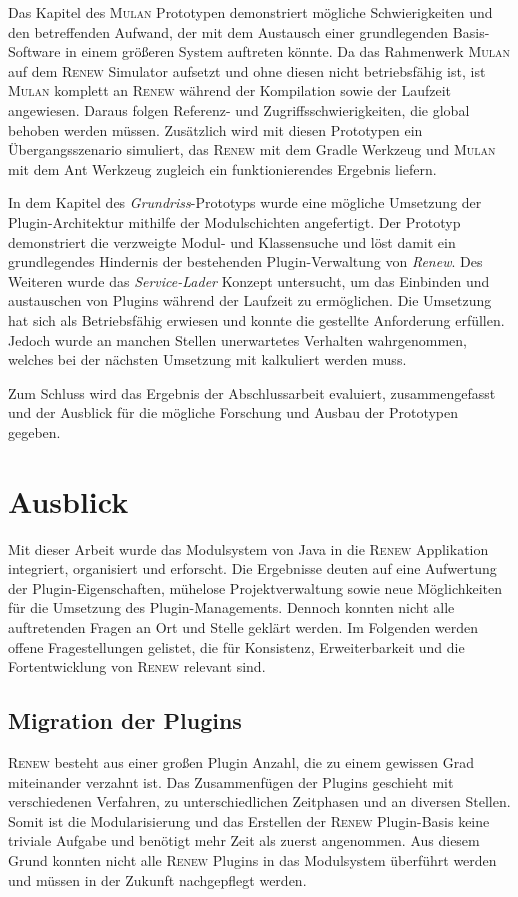 Das Kapitel des \textsc{Mulan} Prototypen demonstriert mögliche Schwierigkeiten und den betreffenden Aufwand, der mit dem Austausch einer grundlegenden Basis-Software in einem größeren System auftreten könnte. Da das Rahmenwerk \textsc{Mulan} auf dem \textsc{Renew} Simulator aufsetzt und ohne diesen nicht betriebsfähig ist, ist \textsc{Mulan} komplett an \textsc{Renew} während der Kompilation sowie der Laufzeit angewiesen. Daraus folgen Referenz- und Zugriffsschwierigkeiten, die global behoben werden müssen. Zusätzlich wird mit diesen Prototypen ein Übergangsszenario simuliert, das \textsc{Renew} mit dem Gradle Werkzeug und \textsc{Mulan} mit dem Ant Werkzeug zugleich ein funktionierendes Ergebnis liefern. \bigbreak

In dem Kapitel des \textit{Grundriss}-Prototyps wurde eine mögliche Umsetzung der Plugin-Architektur mithilfe der Modulschichten angefertigt. Der Prototyp demonstriert die verzweigte Modul- und Klassensuche und löst damit ein grundlegendes Hindernis der bestehenden Plugin-Verwaltung von \textit{Renew}. Des Weiteren wurde das \textit{Service-Lader} Konzept untersucht, um das Einbinden und austauschen von Plugins während der Laufzeit zu ermöglichen. Die Umsetzung hat sich als Betriebsfähig erwiesen und konnte die gestellte Anforderung erfüllen. Jedoch wurde an manchen Stellen unerwartetes Verhalten wahrgenommen, welches bei der nächsten Umsetzung mit kalkuliert werden muss. \bigbreak

Zum Schluss wird das Ergebnis der Abschlussarbeit evaluiert, zusammengefasst und der Ausblick für die mögliche Forschung und Ausbau der Prototypen gegeben. 


\section{Ausblick} 
	Mit dieser Arbeit wurde das Modulsystem von Java in die \textsc{Renew} Applikation integriert, organisiert und erforscht. Die Ergebnisse deuten auf eine Aufwertung der Plugin-Eigenschaften, mühelose Projektverwaltung sowie neue Möglichkeiten für die Umsetzung des Plugin-Managements. Dennoch konnten nicht alle auftretenden Fragen an Ort und Stelle geklärt werden.\bigbreak
	Im Folgenden werden offene Fragestellungen gelistet, die für Konsistenz, Erweiterbarkeit und die Fortentwicklung von \textsc{Renew} relevant sind.  
	
 \subsection*{Migration der Plugins}
	\textsc{Renew} besteht aus einer großen Plugin Anzahl, die zu einem gewissen Grad miteinander verzahnt ist. Das  Zusammenfügen der Plugins geschieht mit verschiedenen Verfahren, zu unterschiedlichen Zeitphasen und an diversen Stellen. Somit ist die Modularisierung und das Erstellen der \textsc{Renew} Plugin-Basis keine triviale Aufgabe und benötigt mehr Zeit als zuerst angenommen. Aus diesem Grund konnten nicht alle \textsc{Renew} Plugins in das Modulsystem überführt werden und müssen in der Zukunft nachgepflegt werden. 

